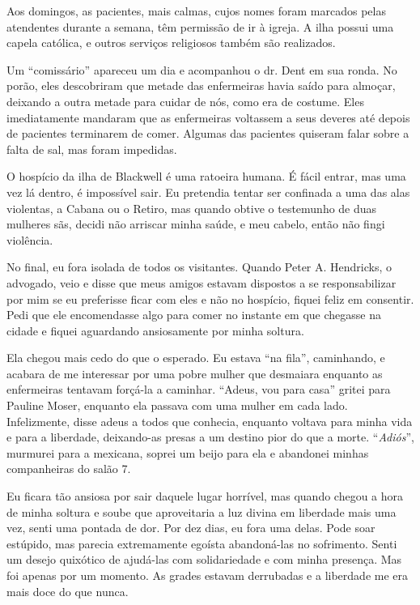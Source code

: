 Aos domingos, as pacientes, mais calmas, cujos nomes foram marcados
pelas atendentes durante a semana, têm permissão de ir à igreja. A ilha
possui uma capela católica, e outros serviços religiosos também são
realizados.

Um ``comissário'' apareceu um dia e acompanhou o dr. Dent em sua ronda.
No porão, eles descobriram que metade das enfermeiras havia saído para
almoçar, deixando a outra metade para cuidar de nós, como era de
costume. Eles imediatamente mandaram que as enfermeiras voltassem a seus
deveres até depois de pacientes terminarem de comer. Algumas das pacientes
quiseram falar sobre a falta de sal, mas foram impedidas.

O hospício da ilha de Blackwell é uma ratoeira humana. É fácil entrar,
mas uma vez lá dentro, é impossível sair. Eu pretendia tentar ser
confinada a uma das alas violentas, a Cabana ou o Retiro, mas quando
obtive o testemunho de duas mulheres sãs, decidi não arriscar minha
saúde, e meu cabelo, então não fingi violência.

No final, eu fora isolada de todos os visitantes. Quando Peter A.
Hendricks, o advogado, veio e disse que meus amigos estavam dispostos a
se responsabilizar por mim se eu preferisse ficar com eles e não no
hospício, fiquei feliz em consentir. Pedi que ele encomendasse algo para
comer no instante em que chegasse na cidade e fiquei aguardando
ansiosamente por minha soltura.

Ela chegou mais cedo do que o esperado. Eu estava ``na fila'',
caminhando, e acabara de me interessar por uma pobre mulher que
desmaiara enquanto as enfermeiras tentavam forçá-la a caminhar.
``Adeus, vou para casa'' gritei para Pauline Moser, enquanto ela
passava com uma mulher em cada lado. Infelizmente, disse adeus a todos
que conhecia, enquanto voltava para minha vida e para a liberdade,
deixando-as presas a um destino pior do que a morte. ``\emph{Adiós}'',
murmurei para a mexicana, soprei um beijo para ela e abandonei
minhas companheiras do salão 7.

Eu ficara tão ansiosa por sair daquele lugar horrível, mas quando chegou
a hora de minha soltura e soube que aproveitaria a luz divina em
liberdade mais uma vez, senti uma pontada de dor. Por dez dias, eu fora
uma delas. Pode soar estúpido, mas parecia extremamente egoísta
abandoná-las no sofrimento. Senti um desejo quixótico de ajudá-las com
solidariedade e com minha presença. Mas foi apenas por um momento. As
grades estavam derrubadas e a liberdade me era mais doce do que nunca.

